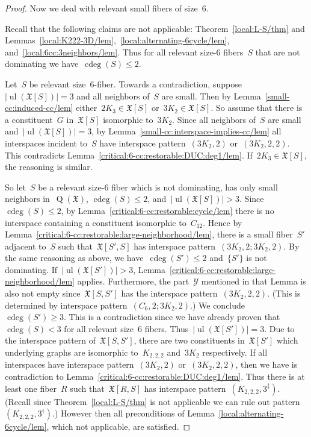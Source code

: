 \documentclass[english,a4paper]{article}
\theoremstyle{plain}
\theoremstyle{definition}
\newcommand{\coherentConfig}{\ensuremath{\mathfrak{X}}}
\newcommand{\interspace}[2]{\ensuremath{\coherentConfig[#1,#2]}}
\newcommand{\inducedCC}[1]{\ensuremath{\coherentConfig[#1]}}
\DeclareMathOperator*{\ul}{ul}
\DeclareMathOperator*{\Quotient}{Q}
\newcommand{\quotientGraph}[1]{\ensuremath{\Quotient(#1)}}
\DeclareMathOperator{\ColorDeg}{cdeg}
\newcommand{\colorDeg}[1]{\ensuremath{\ColorDeg\left(#1\right)}}
\newcommand{\ipsixMatching}             {\ensuremath{(\disjointCliques{3}{2},2)}}
\newcommand{\ipsixMatchingTwice}        {\ensuremath{(\disjointCliques{3}{2},2,2)}}
\newcommand{\ipsixMatchingMatching}     {\ensuremath{(\disjointCliques{3}{2},2;\disjointCliques{3}{2},2)}}
\newcommand{\ipsixMatchingAndCycle}     {\ensuremath{(\cycle{6},2;\disjointCliques{3}{2},2)}}
\newcommand{\ipsixMatchingComplement} {\ensuremath{(\clique{2,2,2},3^\dag)}}
\newcommand{\ipsixMatchingComplementD}{\ensuremath{(\clique{2,2,2},3^\ddag)}}
\newcommand{\clique}[1]{\ensuremath{K_{#1}}}
\newcommand{\cycle}[1]{\ensuremath{C_{#1}}}
\newcommand{\disjointCliques}[2]{\ensuremath{#1 \clique{#2}}}
\begin{document}
\begin{proof}
    Now we deal with relevant small fibers of size~$6$.

    Recall that the following claims are not applicable:
    Theorem~\ref{local:L-S/thm} and Lemmas~\ref{local:K222-3D/lem},~\ref{local:alternating-6cycle/lem}, and~\ref{local:6cc:3neighbors/lem}.
    Thus for all relevant size-$6$ fibers~$S$ that are not dominating we have~$\colorDeg{S} \leq 2$.

    Let~$S$ be relevant size~$6$-fiber.
    Towards a contradiction, suppose~$|\ul(\inducedCC{S})| = 3$ and all neighbors of~$S$ are small.
    Then by Lemma~\ref{small-cc:induced-cc/lem} either~$\disjointCliques{2}{3} \in \inducedCC{S}$ or~$\disjointCliques{3}{2} \in \inducedCC{S}$.
    So assume that there is a constituent~$G$ in~$\inducedCC{S}$ isomorphic to~$\disjointCliques{3}{2}$.
    Since all neighbors of~$S$ are small and~$|\ul(\inducedCC{S})| = 3$, by Lemma~\ref{small-cc:interspace-implies-cc/lem} all interspaces incident to~$S$ have interspace pattern~$\ipsixMatching$ or~$\ipsixMatchingTwice$.
    This contradicts Lemma~\ref{critical:6-cc:restorable:DUC:deg1/lem}.
    If~$\disjointCliques{2}{3}\in\inducedCC{S}$, the reasoning is similar.

    So let~$S$ be a relevant size-$6$ fiber which is not dominating, has only small neighbors in~$\quotientGraph{\coherentConfig}$, $\colorDeg{S} \leq 2$, and~$|\ul(\inducedCC{S})| > 3$.
    Since~$\colorDeg{S} \leq 2$, by Lemma~\ref{critical:6-cc:restorable:cycle/lem} there is no interspace containing a constituent isomorphic to~$\cycle{12}$.
    Hence by Lemma~\ref{critical:6-cc:restorable:large-neighborhood/lem}, there is a small fiber~$S'$ adjacent to~$S$ such that~$\interspace{S'}{S}$ has interspace pattern~$\ipsixMatchingMatching$.
    By the same reasoning as above, we have~$\colorDeg{S'} \leq 2$ and~$\{S'\}$ is not dominating.
    If~$|\ul(\inducedCC{S'})| > 3$, Lemma~\ref{critical:6-cc:restorable:large-neighborhood/lem} applies.
    Furthermore, the part~$\mathcal{Y}$ mentioned in that Lemma is also not empty since~$\interspace{S}{S'}$ has the interspace pattern~$\ipsixMatchingTwice$. (This is determined by interspace pattern~$\ipsixMatchingAndCycle$.)
    We conclude~$\colorDeg{S'} \geq 3$.
    This is a contradiction since we have already proven that~$\colorDeg{S} < 3$ for all relevant size~$6$ fibers.
    Thus~$|\ul(\inducedCC{S'})| = 3$.
    Due to the interspace pattern of~$\interspace{S}{S'}$, there are two constituents in~$\inducedCC{S'}$ which underlying graphs are isomorphic to~$\clique{2,2,2}$ and~$\disjointCliques{3}{2}$ respectively.
    If all interspaces have interspace pattern~$\ipsixMatching$ or~$\ipsixMatchingTwice$, then we have is contradiction to Lemma~\ref{critical:6-cc:restorable:DUC:deg1/lem}.
    Thus there is at least one fiber~$R$ such that~$\interspace{R}{S}$ has interspace pattern~$\ipsixMatchingComplementD$. (Recall since Theorem~\ref{local:L-S/thm} is not applicable we can rule out pattern~$\ipsixMatchingComplement$.)
    However then all preconditions of Lemma~\ref{local:alternating-6cycle/lem}, which not applicable, are satisfied.


\end{proof}
\end{document}
